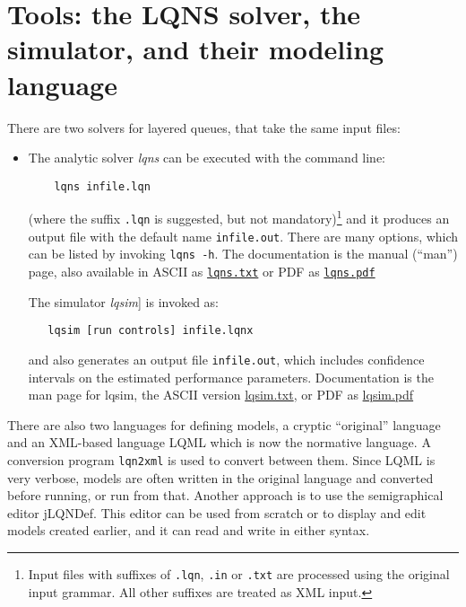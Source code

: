 \documentclass[11pt]{article}
\begin{document}
\section{Tools: the LQNS solver, the simulator, and their modeling language}
\label{sec:tools}

There are two solvers for layered queues, that take the same input files:
\begin{itemize}
\item The analytic solver \emph{lqns} can be executed with the command line:
\begin{verbatim}
    lqns infile.lqn
\end{verbatim}
  (where the suffix \texttt{.lqn} is suggested, but not
  mandatory)\footnote{Input files with suffixes of \texttt{.lqn},
    \texttt{.in} or \texttt{.txt} are processed using the original
    input grammar.  All other suffixes are treated as XML input.} and it
  produces an output file with the default name \texttt{infile.out}. There are
  many options, which can be listed by invoking \texttt{lqns -h}. The
  documentation is the manual (``man'') page, also available in ASCII as
  \href{http://www.sce.carleton.ca/rads/lqns/lqn-documentation/lqns.txt}{\texttt{lqns.txt}}
  or PDF as \href{http://www.sce.carleton.ca/rads/lqns/lqn-documentation/lqns.pdf}{\texttt{lqns.pdf}}

The simulator \emph{lqsim}] is invoked as:
\begin{verbatim}
   lqsim [run controls] infile.lqnx
\end{verbatim}
and also generates an output file \texttt{infile.out}, which includes
confidence intervals on the estimated performance parameters.
Documentation is the man page for lqsim, the ASCII version
\href{http://www.sce.carleton.ca/rads/lqns/lqn-documentation/lqns.txt}{lqsim.txt},
or PDF as
\href{http://www.sce.carleton.ca/rads/lqns/lqn-documentation/lqns.pdf}{lqsim.pdf}
\end{itemize}

There are also two languages for defining models, a cryptic ``original'' language and an XML-based
language LQML which is now the normative language. A conversion program \texttt{lqn2xml} is
used to convert between them. Since LQML is very verbose, models are often written in the original
language and converted before running, or run from that. Another approach is to use the semigraphical
editor jLQNDef. This editor can be used from scratch or to display and edit models
created earlier, and it can read and write in either syntax.
\end{document}
